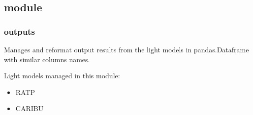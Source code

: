 \documentclass[letterpaper,10pt,english]{sphinxmanual}
\begin{document}
\subsection{ module}
\label{\detokenize{reference:module-outputs}}\label{\detokenize{reference:outputs-module}}

\subsubsection{outputs}
\label{\detokenize{reference:outputs}}
\sphinxAtStartPar
Manages and reformat output results from the light models in pandas.Dataframe with similar columns
names.

\sphinxAtStartPar
Light models managed in this module:
\begin{itemize}
\item {} 
\sphinxAtStartPar
RATP

\item {} 
\sphinxAtStartPar
CARIBU

\end{itemize}
\end{document}

